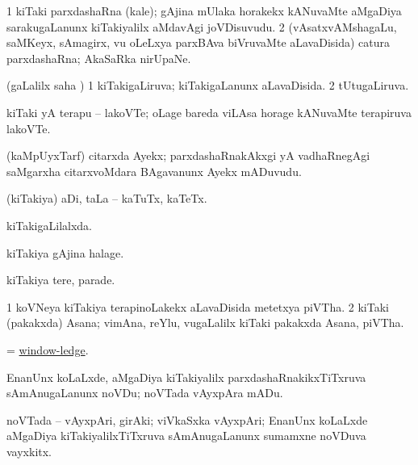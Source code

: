 \bentry
{}
\gl{\nA}
\bmng
\bnum
\num{1} kiTaki parxdashaRna (kale); gAjina mUlaka horakekx kANuvaMte aMgaDiya sarakugaLanunx kiTakiyalilx aMdavAgi joVDisuvudu. 
\num{2} (vAsatxvAMshagaLu, saMKeyx, sAmagirx, \mo vu oLeLxya parxBAva biVruvaMte aLavaDisida) catura parxdashaRna; AkaSaRka nirUpaNe. 
\enum
\emng
\eentry

\bentry
{}
\gl{\gu}
\bmng
(\saMpa gaLalilx saha \parx) 
\bnum
\num{1} kiTakigaLiruva; kiTakigaLanunx aLavaDisida. 
\num{2} tUtugaLiruva. 
\enum
\emng
\eentry

\bentry
{}
\gl{\nA}
\bmng
kiTaki yA terapu -- lakoVTe; oLage bareda viLAsa horage kANuvaMte terapiruva lakoVTe. 
\emng
\eentry

\bentry
{}
\gl{\nA}
\bmng
(kaMpUyxTarf) citarxda Ayekx; parxdashaRnakAkxgi yA vadhaRnegAgi saMgarxha citarxvoMdara BAgavanunx Ayekx mADuvudu. 
\emng
\eentry

\bentry
{}
\gl{\nA}
\bmng
(kiTakiya) aDi, taLa -- kaTuTx, kaTeTx. 
\emng
\eentry

\bentry
{}
\gl{\gu}
\bmng
kiTakigaLilalxda. 
\emng
\eentry

\bentry
{}
\gl{\nA}
\bmng
kiTakiya gAjina halage. 
\emng
\eentry

\bentry
{}
\gl{\nA}
\bmng
kiTakiya tere, parade. 
\emng
\eentry

\bentry
{}
\gl{\nA}
\bmng
\bnum
\num{1} koVNeya kiTakiya terapinoLakekx aLavaDisida metetxya piVTha. 
\num{2} kiTaki (pakakxda) Asana; vimAna, reYlu, \mo vugaLalilx kiTaki pakakxda Asana, piVTha. 
\enum
\emng
\eentry

\bentry
{}
\gl{\nA}
\bmng
= \hyperlink{window-ledge}{window-ledge}. 
\emng
\eentry

\bentry
{}
\gl{\sakirx} 
\bmng
EnanUnx koLaLxde, aMgaDiya kiTakiyalilx parxdashaRnakikxTiTxruva sAmAnugaLanunx noVDu; noVTada vAyxpAra mADu. 
\emng
\eentry

\bentry
{}
\gl{\nA}
\bmng
noVTada -- vAyxpAri, girAki; viVkaSxka vAyxpAri; EnanUnx koLaLxde aMgaDiya kiTakiyalilxTiTxruva sAmAnugaLanunx sumamxne noVDuva vayxkitx. 
\emng
\eentry

